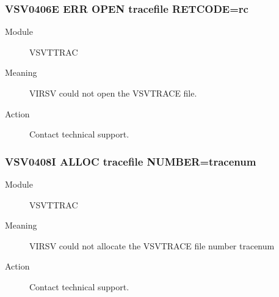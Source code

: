 \documentclass[letterpaper,10pt,english]{sphinxmanual}
\begin{document}
\subsubsection{VSV0406E ERR OPEN tracefile RETCODE=rc}
\label{\detokenize{messages:vsv0406e-err-open-tracefile-retcode-rc}}\begin{description}
\item[{Module}] \leavevmode
VSVTTRAC

\item[{Meaning}] \leavevmode
VIRSV could not open the VSVTRACE file.

\item[{Action}] \leavevmode
Contact technical support.

\end{description}


\subsubsection{VSV0408I ALLOC tracefile NUMBER=tracenum}
\label{\detokenize{messages:vsv0408i-alloc-tracefile-number-tracenum}}\begin{description}
\item[{Module}] \leavevmode
VSVTTRAC

\item[{Meaning}] \leavevmode
VIRSV could not allocate the VSVTRACE file number tracenum

\item[{Action}] \leavevmode
Contact technical support.

\end{description}



\renewcommand{\indexname}{Index}
\printindex
\end{document}
